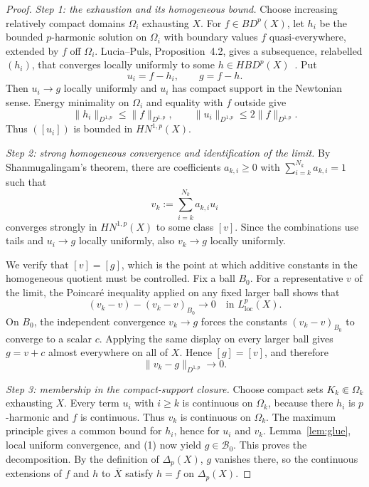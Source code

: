 \documentclass[11pt]{article}
\newcommand{\BD}{BD^p(X)}
\newcommand{\HBD}{HBD^p(X)}
\newcommand{\HN}{HN^{1,p}(X)}
\newcommand{\DeltaP}{\Delta_p(X)}
\newcommand{\Rbar}{\overline X}
\begin{document}
\begin{proof}
\textit{Step 1: the exhaustion and its homogeneous bound.}
Choose increasing relatively compact domains $\Omega_i$ exhausting $X$.
For $f\in\BD$, let $h_i$ be the bounded $p$-harmonic solution on $\Omega_i$
with boundary values $f$ quasi-everywhere, extended by $f$ off $\Omega_i$.
Lucia--Puls, Proposition~4.2, gives a subsequence, relabelled $(h_i)$, that
converges locally uniformly to some $h\in\HBD$~\cite{LP}.  Put
\[
 u_i=f-h_i,
 \qquad g=f-h.
\]
Then $u_i\to g$ locally uniformly and $u_i$ has compact support in the
Newtonian sense.  Energy minimality on $\Omega_i$ and equality with $f$
outside give
\[
 \|h_i\|_{D^{1,p}}\leq\|f\|_{D^{1,p}},
 \qquad
 \|u_i\|_{D^{1,p}}
 \leq2\|f\|_{D^{1,p}}.
\]
Thus $([u_i])$ is bounded in $\HN$.

\textit{Step 2: strong homogeneous convergence and identification of the
limit.}
By Shanmugalingam's theorem, there are coefficients $a_{k,i}\geq0$ with
$\sum_{i=k}^{N_k}a_{k,i}=1$ such that
\[
 v_k:=\sum_{i=k}^{N_k}a_{k,i}u_i
\]
converges strongly in $\HN$ to some class $[v]$.  Since the combinations use
tails and $u_i\to g$ locally uniformly, also $v_k\to g$ locally uniformly.

We verify that $[v]=[g]$, which is the point at which additive constants in
the homogeneous quotient must be controlled.  Fix a ball $B_0$.  For a
representative $v$ of the limit, the Poincar\'e inequality applied on any
fixed larger ball shows that
\[
 (v_k-v)-(v_k-v)_{B_0}\longrightarrow0
 \quad\text{in }L^p_{\mathrm{loc}}(X).
\]
On $B_0$, the independent convergence $v_k\to g$ forces the constants
$(v_k-v)_{B_0}$ to converge to a scalar $c$.  Applying the same display on
every larger ball gives $g=v+c$ almost everywhere on all of $X$.  Hence
$[g]=[v]$, and therefore
\[
 \|v_k-g\|_{D^{1,p}}\longrightarrow0.                 \tag{1}
\]

\textit{Step 3: membership in the compact-support closure.}
Choose compact sets $K_k\Subset\Omega_k$ exhausting $X$.  Every term $u_i$
with $i\geq k$ is continuous on $\Omega_k$, because there $h_i$ is
$p$-harmonic and $f$ is continuous.  Thus $v_k$ is continuous on
$\Omega_k$.  The maximum principle gives a common bound for $h_i$, hence for
$u_i$ and $v_k$.  Lemma~\ref{lem:glue}, local uniform convergence, and (1)
now yield $g\in\mathcal B_0$.  This proves the decomposition.  By the
definition of $\DeltaP$, $g$ vanishes there, so the continuous extensions of
$f$ and $h$ to $\Rbar$ satisfy $h=f$ on $\DeltaP$.


\end{proof}
\end{document}
